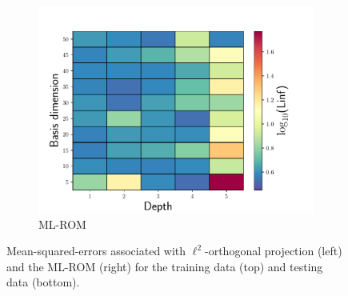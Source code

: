 \documentclass[3p,computermodern,10pt]{elsarticle}
\begin{document}
\begin{figure}
\begin{center}
\begin{subfigure}[t]{0.32\textwidth}
\includegraphics[trim={0cm 0cm 0cm 0cm},clip,width=1.0\linewidth]{code/burgers/synapse_models/basis_study/results/Linf_ML.pdf}
\caption{ML-ROM}
\end{subfigure}

\caption{Mean-squared-errors associated with $\ell^2$-orthogonal projection (left) and the ML-ROM (right) for the training data (top) and testing data (bottom).}
\label{fig:burg_training_test_projection_mse}
\end{center}
\end{figure}
\end{document}
